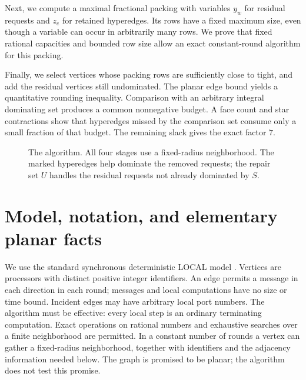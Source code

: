 \documentclass[11pt,a4paper]{article}
\theoremstyle{definition}
\theoremstyle{remark}
\newcommand{\LOCAL}{\textsf{LOCAL}}
\begin{document}
Next, we compute a maximal fractional packing with variables \(y_w\) for
residual requests and \(z_e\) for retained hyperedges. Its rows have a fixed
maximum size, even though a variable can occur in arbitrarily many rows.
We prove that fixed rational capacities and bounded row size allow an
exact constant-round algorithm for this packing.

Finally, we select vertices whose packing rows are sufficiently close to
tight, and add the residual vertices still undominated. The planar
edge bound yields a quantitative rounding inequality. Comparison with
an arbitrary integral dominating set produces a common nonnegative
budget. A face count and star contractions show that hyperedges missed by
the comparison set consume only a small fraction of that budget. The
remaining slack gives the exact factor \(7\).

\begin{figure}[t]
\centering
{}
\caption{The algorithm. All four stages use a fixed-radius neighborhood.
The marked hyperedges help dominate the removed requests; the repair set
\(U\) handles the residual requests not already dominated by \(S\).}
\label{fig:pipeline}
\end{figure}

\section{Model, notation, and elementary planar facts}
\label{sec:preliminaries}

We use the standard synchronous deterministic \LOCAL{} model
\cite{Linial92,Suomela13}. Vertices are processors with distinct positive
integer identifiers.
An edge permits a message in each direction in each round; messages and
local computations have no size or time bound. Incident edges may have
arbitrary local port numbers. The algorithm must be effective: every local
step is an ordinary terminating computation. Exact operations on rational
numbers and exhaustive searches over a finite neighborhood are permitted.
In a constant number of rounds a vertex can gather a fixed-radius
neighborhood, together with identifiers and the adjacency information
needed below. The graph is promised to be planar; the algorithm does not
test this promise.
\end{document}
